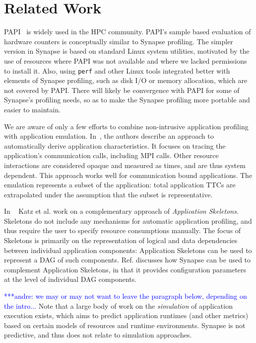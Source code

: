 \documentclass[10pt, conference, compsocconf]{IEEEtran}
\newcommand{\I}[1]{\textit{#1}\xspace}
\newcommand{\amnote}[1]{   {\textcolor{blue}  { ***andre:    #1 }}}
\newcommand{\amnote}[1]{}
\newcommand{\synapse}{Synapse\xspace}
\newcommand{\Synapse}{Synapse\xspace}
\begin{document}
\section{Related Work}
\label{sec:related}



PAPI~\cite{papi2004} is widely used in the HPC community.  PAPI's sample based
evaluation of hardware counters is conceptually similar to \synapse profiling.
The simpler version in \synapse is based on standard Linux system utilities,
motivated by the use of resources where PAPI was not available and where we
lacked permissions to install it.  Also, using \texttt{perf} and other Linux
tools integrated better with elements of \synapse profiling, such as disk I/O or
memory allocation, which are not covered by PAPI.  There will likely be
convergence with PAPI for some of \synapse's profiling needs, so as to make the
\synapse profiling more portable and easier to maintain.

We are aware of only a few efforts to combine non-intrusive application
profiling with application emulation.  In~\cite{sodhi2004skeleton}, the authors
describe an approach to automatically derive application characteristics. It
focuses on tracing the application's communication calls, including MPI calls.
Other resource interactions are considered opaque and measured as times, and are
thus system dependent.  This approach works well for communication bound
applications.  The emulation represents a subset of the application: total
application TTCs are extrapolated under the assumption that the subset is
representative.

In ~\cite{skeleton-synapse15} Katz et al. work on a complementary approach of
\I{Application Skeletons}.  Skeletons do not include any mechanisms for
automatic application profiling, and thus require the user to specify resource
consumptions manually.  The focus of Skeletons is primarily on the
representation of logical and data dependencies between individual application
components: Application Skeletons can be used to represent a DAG of such
components.  Ref. \cite{skeleton-synapse15} discusses how \synapse can be used
to complement Application Skeletons, in that it provides configuration
parameters at the level of individual DAG components.

\amnote{we may or may not want to leave the paragraph below, depending on the
  intro...}  Note that a large body of work on the \I{simulation} of application
execution exists, which aims to predict application runtimes (and other metrics)
based on certain models of resources and runtime environments.  \Synapse is not
predictive, and thus does not relate to simulation approaches.
\end{document}
